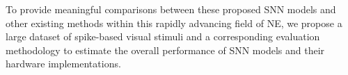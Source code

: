 To provide meaningful comparisons between these proposed SNN models and other existing methods within this rapidly advancing field of NE, we propose a large dataset of spike-based visual stimuli and a corresponding evaluation methodology to estimate the overall performance of SNN models and their hardware implementations.
